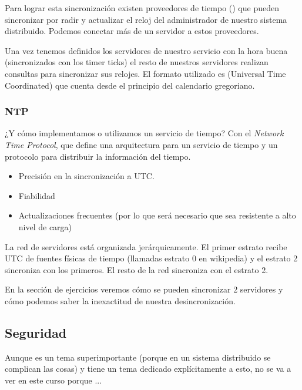 Para lograr esta sincronización existen proveedores de tiempo () que pueden sincronizar por radir y actualizar el reloj del administrador de nuestro sistema distribuido. Podemos conectar más de un servidor a estos proveedores.

Una vez tenemos definidos los servidores de nuestro servicio con la hora buena (sincronizados con los timer ticks) el resto de nuestros servidores realizan consultas para sincronizar sus relojes. El formato utilizado es  (Universal Time Coordinated) que cuenta desde el principio del calendario gregoriano.


\subsubsection{NTP}
¿Y cómo implementamos o utilizamos un servicio de tiempo? Con el  \textit{Network Time Protocol}, que define una arquitectura para un servicio de tiempo y un protocolo para distribuir la información del tiempo.

\begin{itemize}
	\item Precisión en la sincronización a UTC.
	\item Fiabilidad
	\item Actualizaciones frecuentes (por lo que será necesario que sea resistente a alto nivel de carga)
\end{itemize}

La red de servidores está organizada jerárquicamente. El primer estrato recibe UTC de fuentes  físicas de tiempo (llamadas estrato 0 en wikipedia) y el estrato 2 sincroniza con los primeros. El resto de la red sincroniza con el estrato 2.

En la sección de ejercicios veremos cómo se pueden sincronizar 2 servidores y cómo podemos saber la inexactitud de nuestra desincronización.

\subsection{Seguridad}
Aunque es un tema superimportante (porque en un sistema distribuido se complican las cosas) y tiene un tema dedicado explícitamente a esto, no se va a ver en este curso porque ...

